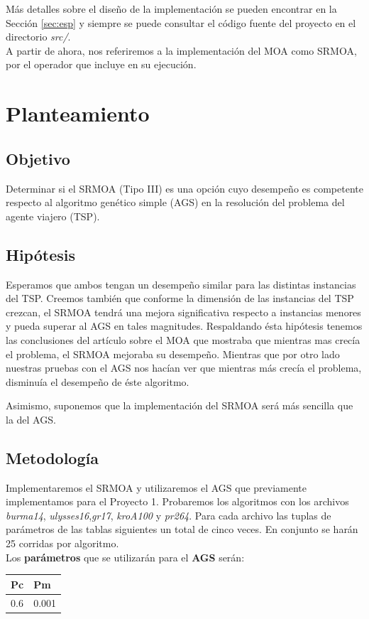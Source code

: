 \documentclass[12pt]{article}
\begin{document}
Más detalles sobre el diseño de la implementación se pueden encontrar en la Sección \ref{sec:esp} y siempre se puede consultar el código fuente
del proyecto en el directorio \textit{src/}.\\

A partir de ahora, nos referiremos a la implementación del MOA como SRMOA, por el operador que incluye en su ejecución.
\newpage
\section{Planteamiento}
\subsection*{Objetivo}
Determinar si el SRMOA (Tipo III) es una opción cuyo desempeño es competente respecto al algoritmo genético simple (AGS) en la resolución del problema del agente viajero (TSP).
\subsection*{Hipótesis}
 Esperamos que ambos tengan un desempeño similar para las distintas instancias del TSP. Creemos también que conforme la dimensión de las instancias del TSP crezcan, el SRMOA tendrá una mejora significativa respecto a instancias menores y pueda superar al AGS en tales magnitudes.  Respaldando ésta hipótesis tenemos las conclusiones del artículo sobre el MOA que mostraba que mientras mas crecía el problema, el SRMOA mejoraba su desempeño. Mientras que por otro lado nuestras pruebas con el AGS nos hacían ver que mientras más crecía el problema, disminuía el desempeño de éste algoritmo.

Asimismo, suponemos que la implementación del SRMOA será más sencilla que la del AGS.
\subsection*{Metodología}\label{sec:met}
Implementaremos el SRMOA y utilizaremos el AGS que previamente implementamos para el Proyecto 1. Probaremos los algoritmos con los archivos \textit{burma14}, \textit{ulysses16},\textit{gr17}, \textit{kroA100} y \textit{pr264}. Para cada archivo las tuplas de parámetros de las tablas siguientes un total de cinco veces. En conjunto se harán 25 corridas por algoritmo.\\


Los \textbf{parámetros} que se utilizarán para el \textbf{AGS} serán:
\begin{center}
\begin{tabularx}{0.25\textwidth}{|X|X|}
  \hline
\textbf{Pc} &  \textbf{Pm} \\ \hline
0.6 & 0.001 \\ \hline
\end{tabularx}
\end{center}
\end{document}
